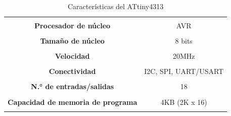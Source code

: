 \documentclass[12pt,letterpaper]{article}
\begin{document}
\begin{table}[H]
\centering
\caption{Características del ATtiny4313}
\label{001}
\begin{tabular}{|c|c|}
\hline
{\color[HTML]{222222} }                                                            & {\color[HTML]{000000} }                                       \\
\multirow{-2}{*}{{\color[HTML]{222222} \textbf{Procesador de núcleo}}}             & \multirow{-2}{*}{{\color[HTML]{000000} AVR}}                  \\ \hline
{\color[HTML]{222222} }                                                            & {\color[HTML]{444444} }                                       \\
\multirow{-2}{*}{{\color[HTML]{222222} \textbf{Tamaño de núcleo}}}                 & \multirow{-2}{*}{{\color[HTML]{444444} 8 bits}}               \\ \hline
{\color[HTML]{222222} }                                                            & {\color[HTML]{444444} }                                       \\
\multirow{-2}{*}{{\color[HTML]{222222} \textbf{Velocidad}}}                        & \multirow{-2}{*}{{\color[HTML]{444444} 20MHz}}                \\ \hline
{\color[HTML]{222222} }                                                            & {\color[HTML]{444444} }                                       \\
\multirow{-2}{*}{{\color[HTML]{222222} \textbf{Conectividad}}}                     & \multirow{-2}{*}{{\color[HTML]{444444} I2C, SPI, UART/USART}} \\ \hline
{\color[HTML]{222222} }                                                            & {\color[HTML]{444444} }                                       \\
\multirow{-2}{*}{{\color[HTML]{222222} \textbf{N.° de entradas/salidas}}}          & \multirow{-2}{*}{{\color[HTML]{444444} 18}}                   \\ \hline
{\color[HTML]{222222} }                                                            & {\color[HTML]{444444} }                                       \\
\multirow{-2}{*}{{\color[HTML]{222222} \textbf{Capacidad de memoria de programa}}} & \multirow{-2}{*}{{\color[HTML]{444444} 4KB (2K x 16)}}        \\ \hline
                                                                                   &                                                               \\

\end{tabular}
\end{table}
\end{document}
